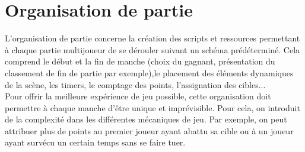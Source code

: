 \documentclass[../doc.tex]{subfiles}
\begin{document}
\section{Organisation de partie}
L'organisation de partie concerne la création des scripts
et ressources permettant à chaque partie multijoueur de se dérouler suivant un schéma prédéterminé. Cela comprend le début et 
la fin de manche (choix du gagnant, présentation du classement
de fin de partie par exemple),le placement des éléments dynamiques de la scène,
les timers, le comptage des points, l'assignation des cibles...
\\

\indent
Pour offrir la meilleure expérience de jeu possible, cette organisation
doit permettre à chaque manche d'être unique et imprévisible.
Pour cela, on introduit de la complexité dans les différentes
mécaniques de jeu. Par exemple, on peut attribuer plus de points
au premier joueur ayant abattu sa cible ou à un joueur ayant
survécu un certain temps sans se faire tuer.
\end{document}
